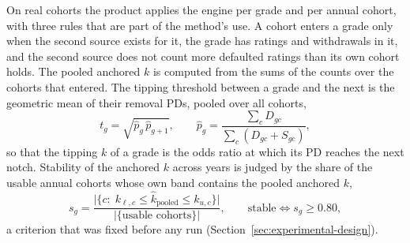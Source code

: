 On real cohorts the product applies the engine per grade and per annual cohort, with three rules that are part of the method's use. A cohort enters a grade only when the second source exists for it, the grade has ratings and withdrawals in it, and the second source does not count more defaulted ratings than its own cohort holds. The pooled anchored $k$ is computed from the sums of the counts over the cohorts that entered. The tipping threshold between a grade and the next is the geometric mean of their removal PDs, pooled over all cohorts,
\begin{equation}
t_g=\sqrt{\widehat p_g\,\widehat p_{g+1}},\qquad \widehat p_g=\frac{\sum_{c}D_{gc}}{\sum_{c}(D_{gc}+S_{gc})},
\label{eq:threshold}
\end{equation}
so that the tipping $k$ of a grade is the odds ratio at which its PD reaches the next notch. Stability of the anchored $k$ across years is judged by the share of the usable annual cohorts whose own band contains the pooled anchored $k$,
\begin{equation}
s_g=\frac{\big|\{c:\;k_{\ell,c}\le\widehat k_{\mathrm{pooled}}\le k_{u,c}\}\big|}{\big|\{\text{usable cohorts}\}\big|},\qquad \text{stable}\iff s_g\ge 0.80,
\label{eq:stability}
\end{equation}
a criterion that was fixed before any run (Section~\ref{sec:experimental-design}).
